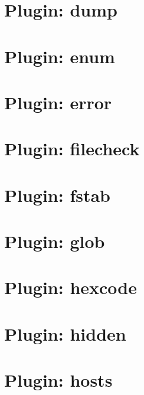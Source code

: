 \documentclass[twoside]{book}
\newcommand{\+}{\discretionary{\mbox{\scriptsize$\hookleftarrow$}}{}{}}
\begin{document}
\chapter{Plugin\+: dump}
\label{md_src_plugins_dump_README}
\hypertarget{md_src_plugins_dump_README}{}

\chapter{Plugin\+: enum}
\label{md_src_plugins_enum_README}
\hypertarget{md_src_plugins_enum_README}{}

\chapter{Plugin\+: error}
\label{md_src_plugins_error_README}
\hypertarget{md_src_plugins_error_README}{}

\chapter{Plugin\+: filecheck}
\label{md_src_plugins_filecheck_README}
\hypertarget{md_src_plugins_filecheck_README}{}

\chapter{Plugin\+: fstab}
\label{md_src_plugins_fstab_README}
\hypertarget{md_src_plugins_fstab_README}{}

\chapter{Plugin\+: glob}
\label{md_src_plugins_glob_README}
\hypertarget{md_src_plugins_glob_README}{}

\chapter{Plugin\+: hexcode}
\label{md_src_plugins_hexcode_README}
\hypertarget{md_src_plugins_hexcode_README}{}

\chapter{Plugin\+: hidden}
\label{md_src_plugins_hidden_README}
\hypertarget{md_src_plugins_hidden_README}{}

\chapter{Plugin\+: hosts}
\label{md_src_plugins_hosts_README}
\hypertarget{md_src_plugins_hosts_README}{}

\end{document}
